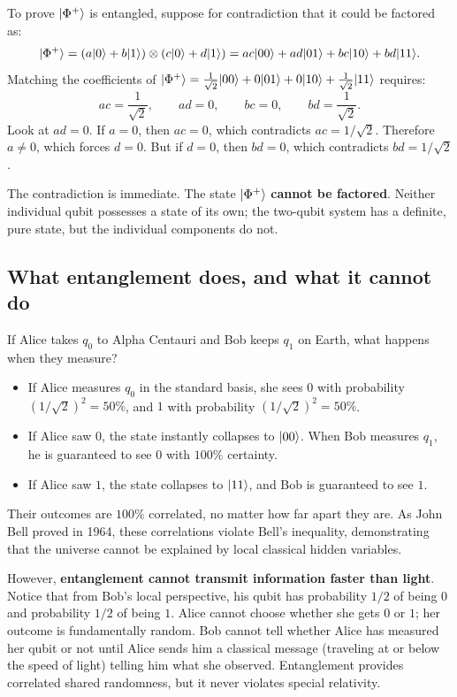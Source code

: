 To prove $\lvert \Phi^+ \rangle$ is entangled, suppose for
contradiction that it could be factored as:
\[
  \lvert \Phi^+ \rangle = (a\lvert 0 \rangle + b\lvert 1 \rangle) \otimes (c\lvert 0 \rangle + d\lvert 1 \rangle)
  = ac\lvert 00 \rangle + ad\lvert 01 \rangle + bc\lvert 10 \rangle + bd\lvert 11 \rangle.
\]
Matching the coefficients of $\lvert \Phi^+ \rangle = \frac{1}{\sqrt{2}}\lvert 00 \rangle + 0\lvert 01 \rangle + 0\lvert 10 \rangle + \frac{1}{\sqrt{2}}\lvert 11 \rangle$ requires:
\[
  ac = \frac{1}{\sqrt{2}}, \qquad ad = 0, \qquad bc = 0, \qquad bd = \frac{1}{\sqrt{2}}.
\]
Look at $ad = 0$. If $a = 0$, then $ac = 0$, which contradicts $ac = 1/\sqrt{2}$.
Therefore $a \ne 0$, which forces $d = 0$. But if $d = 0$, then $bd = 0$, which contradicts
$bd = 1/\sqrt{2}$.

The contradiction is immediate. The state $\lvert \Phi^+ \rangle$ \textbf{cannot be factored}.
Neither individual qubit possesses a state of its own; the two-qubit system has a definite,
pure state, but the individual components do not.

\subsection{What entanglement does, and what it cannot do}

If Alice takes $q_0$ to Alpha Centauri and Bob keeps $q_1$ on Earth, what happens
when they measure?
\begin{itemize}
  \item If Alice measures $q_0$ in the standard basis, she sees $0$ with probability
  $(1/\sqrt{2})^2 = 50\%$, and $1$ with probability $(1/\sqrt{2})^2 = 50\%$.
  \item If Alice saw $0$, the state instantly collapses to $\lvert 00 \rangle$. When Bob measures
  $q_1$, he is guaranteed to see $0$ with $100\%$ certainty.
  \item If Alice saw $1$, the state collapses to $\lvert 11 \rangle$, and Bob is guaranteed to see $1$.
\end{itemize}
Their outcomes are $100\%$ correlated, no matter how far apart they are. As John Bell
proved in 1964, these correlations violate Bell's inequality, demonstrating that the
universe cannot be explained by local classical hidden variables.

However, \textbf{entanglement cannot transmit information faster than light}.
Notice that from Bob's local perspective, his qubit has probability $1/2$ of being $0$
and probability $1/2$ of being $1$. Alice cannot choose whether she gets $0$ or $1$; her
outcome is fundamentally random. Bob cannot tell whether Alice has measured her qubit or
not until Alice sends him a classical message (traveling at or below the speed of light)
telling him what she observed. Entanglement provides correlated shared randomness, but it never violates
special relativity.

